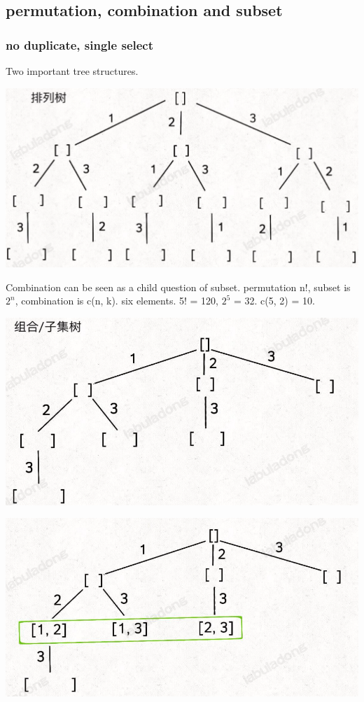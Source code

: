 \documentclass[a4paper,11pt,twoside]{book}
\begin{document}
\subsection{permutation, combination and subset}
\subsubsection{no duplicate, single select}

	\par Two important tree structures.
\begin{center}
	\includegraphics[width=0.5\linewidth]{pics/per}
\end{center}

\par Combination can be seen as a child question of subset.  permutation n!,  subset is $2^n$,  combination is c(n, k). six elements.  5! = 120,  $2^5$ = 32.  c(5, 2) = 10. 

\begin{minipage}{.5\textwidth}		
	\begin{center}
		\includegraphics[width=0.8\linewidth]{pics/com} 
	\end{center}
\end{minipage}	
\begin{minipage}{.5\textwidth}		
	\begin{center}
		\includegraphics[width=0.8\linewidth]{pics/subset}
	\end{center}
\end{minipage}
\end{document}

